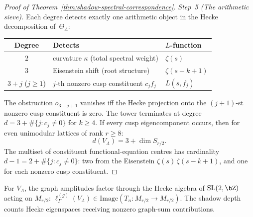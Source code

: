 \begin{proof}[Proof of
Theorem~\textup{\ref{thm:shadow-spectral-correspondence}}]
\emph{Step~5 (The arithmetic sieve).}
Each degree detects exactly one
arithmetic object in the Hecke decomposition of~$\Theta_\Lambda$:
\begin{center}
\small
\renewcommand{\arraystretch}{1.2}
\begin{tabular}{cll}
\toprule
\textbf{Degree} & \textbf{Detects} & \textbf{$L$-function} \\
\midrule
$2$ & curvature $\kappa$ (total spectral weight)
 & $\zeta(s)$ \\
$3$ & Eisenstein shift (root structure)
 & $\zeta(s - k + 1)$ \\
$3+j$ ($j\ge1$) & $j$-th nonzero cusp constituent $c_jf_j$
 & $L(s, f_j)$ \\
\bottomrule
\end{tabular}
\end{center}
The obstruction $o_{3+j+1}$ vanishes iff the Hecke projection onto the
$(j{+}1)$-st nonzero cusp constituent is zero. The tower terminates at
degree $d = 3 + \#\{j:c_j\ne0\}$ for $k \ge 4$. If every cusp
eigencomponent occurs, then for even unimodular lattices of rank
$r \ge 8$:
\begin{equation}\label{eq:depth-cusp-formula}
 d(V_\Lambda) = 3 + \dim S_{r/2}.
\end{equation}
The multiset of constituent functional-equation centres has cardinality
$d - 1 = 2 + \#\{j:c_j\ne0\}$:
two from the Eisenstein $\zeta(s)\,\zeta(s-k+1)$, and one
for each nonzero cusp constituent.
\end{proof}

\begin{remark}
\label{rem:shadow-spectral-CG}
For $V_\Lambda$, the graph amplitudes factor through the Hecke algebra
of $\mathrm{SL}(2,\bZ)$ acting on $M_{r/2}$:
$\ell_\Gamma^{(g)}(V_\Lambda) \in
\mathrm{Image}(T_n \colon M_{r/2} \to M_{r/2})$.
The shadow depth counts Hecke eigenspaces receiving nonzero
graph-sum contributions.
\end{remark}

